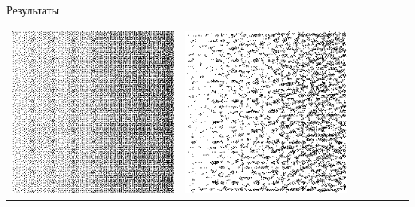 \documentclass[12pt]{beamer}
\begin{document}
\begin{frame}{Результаты}
\begin{table}
\begin{center}
\begin{tabular}{p{1.2cm} p{1.2cm} p{1.2cm} p{1.2cm} p{1.2cm} p{1.2cm} p{1.2cm}}
					\includegraphics[width=1\linewidth]{8-results/sand-trend8/nf64e1/gen1}
					&
					\includegraphics[width=1\linewidth]{8-results/sand-trend8/nf64e5/gen1}
					&

\end{tabular}
\end{center}
\end{table}
\end{frame}
\end{document}
